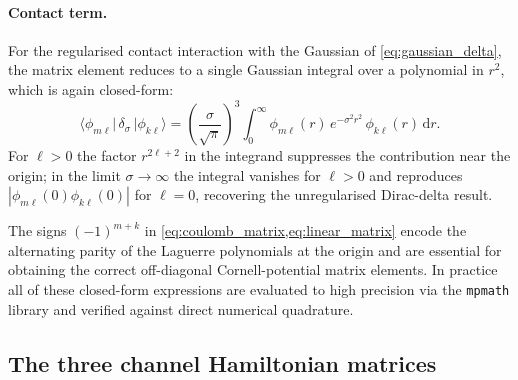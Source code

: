 \paragraph{Contact term.}
For the regularised contact interaction with the Gaussian of
\cref{eq:gaussian_delta}, the matrix element reduces to a single Gaussian
integral over a polynomial in $r^{2}$, which is again closed-form:
\begin{equation}
  \label{eq:contact_matrix}
  \langle\phi_{m\ell}|\,\delta_\sigma\,|\phi_{k\ell}\rangle
  = \left(\frac{\sigma}{\sqrt{\pi}}\right)^{3}\!\!
    \int_0^{\infty}\!\!\phi_{m\ell}(r)\,e^{-\sigma^{2} r^{2}}\,
    \phi_{k\ell}(r)\,\mathrm{d}r.
\end{equation}
For $\ell>0$ the factor $r^{2\ell+2}$ in the integrand suppresses the
contribution near the origin; in the limit $\sigma\to\infty$ the integral
vanishes for $\ell>0$ and reproduces $|\phi_{m\ell}(0)\phi_{k\ell}(0)|$
for $\ell=0$, recovering the unregularised Dirac-delta result.

\begin{remark}
The signs $(-1)^{m+k}$ in \cref{eq:coulomb_matrix,eq:linear_matrix} encode
the alternating parity of the Laguerre polynomials at the origin and are
essential for obtaining the correct off-diagonal Cornell-potential matrix
elements. In practice all of these closed-form expressions are evaluated to
high precision via the \texttt{mpmath} library and verified against direct
numerical quadrature.
\end{remark}

\subsection{The three channel Hamiltonian matrices}
\label{ssec:matrices}

